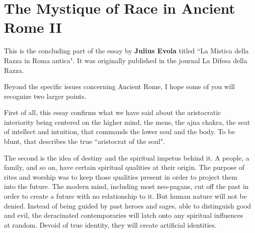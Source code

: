 \section{The Mystique of Race in Ancient Rome II}

\begin{quotex}
This is the concluding part of the essay by \textbf{Julius Evola} titled ``La Mistica della Razza in Roma antica". It was originally published in the journal La Difesa della Razza.

Beyond the specific issues concerning Ancient Rome, I hope some of you will recognize two larger points.

First of all, this essay confirms what we have said about the aristocratic interiority being centered on the higher mind, the mens, the ajna chakra, the seat of intellect and intuition, that commands the lower soul and the body. To be blunt, that describes the true ``aristocrat of the soul".

The second is the idea of destiny and the spiritual impetus behind it. A people, a family, and so on, have certain spiritual qualities at their origin. The purpose of rites and worship was to keep those qualities present in order to project them into the future. The modern mind, including most neo-pagans, cut off the past in order to create a future with no relationship to it. But human nature will not be denied. Instead of being guided by past heroes and sages, able to distinguish good and evil, the deracinated contemporaries will latch onto any spiritual influences at random. Devoid of true identity, they will create artificial identities.

\end{quotex}
